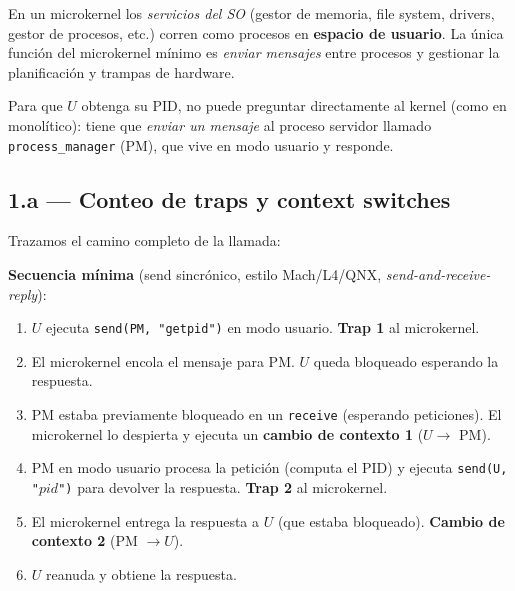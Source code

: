 \documentclass[11pt,a4paper]{article}
\begin{document}
En un microkernel los \emph{servicios del SO} (gestor de memoria,
file system, drivers, gestor de procesos, etc.) corren como procesos
en \textbf{espacio de usuario}. La única función del microkernel
mínimo es \emph{enviar mensajes} entre procesos y gestionar la
planificación y trampas de hardware.

Para que $U$ obtenga su PID, no puede preguntar directamente al
kernel (como en monolítico): tiene que \emph{enviar un mensaje} al
proceso servidor llamado \texttt{process\_manager} (PM), que vive en
modo usuario y responde.

\subsection*{1.a --- Conteo de traps y context switches}

Trazamos el camino completo de la llamada:

\begin{center}
\end{center}

\textbf{Secuencia mínima} (send sincrónico, estilo Mach/L4/QNX,
\emph{send-and-receive-reply}):

\begin{enumerate}[leftmargin=*,nosep]
    \item $U$ ejecuta \texttt{send(PM, "getpid")} en modo usuario.
        \textbf{Trap 1} al microkernel.
    \item El microkernel encola el mensaje para PM. $U$ queda
        bloqueado esperando la respuesta.
    \item PM estaba previamente bloqueado en un \texttt{receive}
        (esperando peticiones). El microkernel lo despierta y
        ejecuta un \textbf{cambio de contexto 1} ($U \to$ PM).
    \item PM en modo usuario procesa la petición (computa el PID)
        y ejecuta \texttt{send(U, "$pid$")} para devolver la
        respuesta. \textbf{Trap 2} al microkernel.
    \item El microkernel entrega la respuesta a $U$ (que estaba
        bloqueado). \textbf{Cambio de contexto 2} (PM $\to U$).
    \item $U$ reanuda y obtiene la respuesta.
\end{enumerate}
\end{document}

